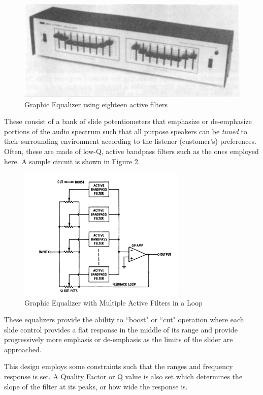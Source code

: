 \documentclass[12pt]{article}
\begin{document}
\begin{figure}[H]
	\centering
	\includegraphics[width=\textwidth]{equalizer}
	\caption{Graphic Equalizer using eighteen active filters}
	\label{fig:equalizer}
\end{figure}
These consist of a bank of slide potentiometers that emphasize or de-emphasize portions of the audio spectrum such that all purpose speakers can be \textit{tuned} to their surrounding environment according to the listener (customer's) preferences. Often, these are made of low-Q, active bandpass filters such as the ones employed here. A sample circuit is shown in Figure \ref{fig:equalizercircuit}.
\begin{figure}[H]
	\centering
	\includegraphics[width=8cm]{equalizercircuit}
	\caption{Graphic Equalizer with Multiple Active Filters in a Loop}
	\label{fig:equalizercircuit}
\end{figure}
These equalizers provide the  ability to ``boost" or ``cut" operation where each slide control provides a flat response in the middle of its range and provide progressively more emphasis or de-emphasis as the limits of the slider are approached.

This design employs some constraints such that the ranges and frequency response is set. A Quality Factor or Q value is also set which determines the slope of the filter at its peaks, or how wide the response is.
\end{document}

